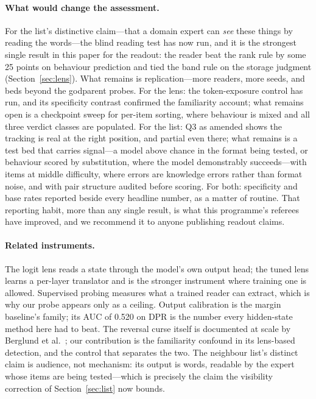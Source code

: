 \documentclass[11pt]{article}
\begin{document}
\paragraph{What would change the assessment.} For the list's distinctive claim---that a domain expert can \emph{see} these things by reading the words---the blind reading test has now run, and it is the strongest single result in this paper for the readout: the reader beat the rank rule by some 25 points on behaviour prediction and tied the band rule on the storage judgment (Section~\ref{sec:lens}). What remains is replication---more readers, more seeds, and beds beyond the godparent probes. For the lens: the token-exposure control has run, and its specificity contrast confirmed the familiarity account; what remains open is a checkpoint sweep for per-item sorting, where behaviour is mixed and all three verdict classes are populated. For the list: Q3 as amended shows the tracking is real at the right position, and partial even there; what remains is a test bed that carries signal---a model above chance in the format being tested, or behaviour scored by substitution, where the model demonstrably succeeds---with items at middle difficulty, where errors are knowledge errors rather than format noise, and with pair structure audited before scoring. For both: specificity
and base rates reported beside every headline number, as a matter of
routine. That reporting habit, more than any single result, is what
this programme's referees have improved, and we recommend it to anyone
publishing readout claims.

\paragraph{Related instruments.}
The logit lens \cite{logitlens} reads a state through the model's own
output head; the tuned lens \cite{tunedlens} learns a per-layer
translator and is the stronger instrument where training one is
allowed. Supervised probing \cite{alainbengio} measures what a trained
reader can extract, which is why our probe appears only as a ceiling.
Output calibration \cite{guo2017} is the margin baseline's family; its
AUC of 0.520 on DPR is the number every hidden-state method here had
to beat. The reversal curse itself is documented at scale by Berglund
et al.\ \cite{berglund2023}; our contribution is the familiarity confound in its lens-based detection, and the control that separates the two. The neighbour list's distinct claim is audience, not
mechanism: its output is words, readable by the expert whose items are
being tested---which is precisely the claim the visibility correction
of Section~\ref{sec:list} now bounds.
\end{document}
